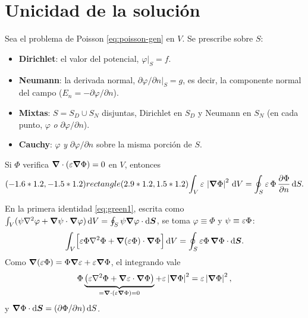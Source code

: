 \documentclass[11pt,a4paper,twoside]{article}
\begin{document}
\section{Unicidad de la solución}

\begin{definicion}\label{def:cc}
Sea el problema de Poisson \eqref{eq:poisson-gen} en $V$. Se prescribe sobre $S$:
\begin{itemize}
  \item \textbf{Dirichlet}: el valor del potencial, $\varphi\big|_S=f$.
  \item \textbf{Neumann}: la derivada normal, $\partial\varphi/\partial n\big|_S=g$, es decir,
  la componente normal del campo ($E_n=-\partial\varphi/\partial n$).
  \item \textbf{Mixtas}: $S=S_D\cup S_N$ disjuntas, Dirichlet en $S_D$ y Neumann en $S_N$
  (en cada punto, $\varphi$ \emph{o} $\partial\varphi/\partial n$).
  \item \textbf{Cauchy}: $\varphi$ \emph{y} $\partial\varphi/\partial n$ sobre la misma
  porción de $S$.
\end{itemize}
\end{definicion}

\begin{lema}\label{lem:energia}
Si $\Phi$ verifica $\bm{\nabla}\cdot(\varepsilon\bm{\nabla}\Phi)=0$ en $V$, entonces
\begin{equation}\label{eq:energia}
  (-1.6*1.2,-1.5*1.2) rectangle (2.9*1.2,1.5*1.2){\int_{V}\varepsilon\,\left\lvert \bm{\nabla}\Phi\right\rvert^{2}\,\mathrm{d} V=\oint_{S}\varepsilon\,\Phi\,\frac{\partial \Phi}{\partial n}\,\mathrm{d} S .}
\end{equation}
\end{lema}

\begin{demostracion}
En la primera identidad \eqref{eq:green1}, escrita como
$\int_V(\psi\nabla^{2}\varphi+\bm{\nabla}\psi\cdot\bm{\nabla}\varphi)\,\mathrm{d} V=\oint_S\psi\bm{\nabla}\varphi\cdot\mathrm{d}\bm{S}$, se
toma $\varphi\equiv\Phi$ y $\psi\equiv\varepsilon\Phi$:
\[
  \int_V\Bigl[\varepsilon\Phi\nabla^{2}\Phi+\bm{\nabla}(\varepsilon\Phi)\cdot\bm{\nabla}\Phi\Bigr]\,\mathrm{d} V
  =\oint_S\varepsilon\Phi\,\bm{\nabla}\Phi\cdot\mathrm{d}\bm{S} .
\]
Como $\bm{\nabla}(\varepsilon\Phi)=\Phi\bm{\nabla}\varepsilon+\varepsilon\bm{\nabla}\Phi$, el integrando vale
\[
  \Phi\underbrace{\bigl(\varepsilon\nabla^{2}\Phi+\bm{\nabla}\varepsilon\cdot\bm{\nabla}\Phi\bigr)}_{=\bm{\nabla}\cdot(\varepsilon\bm{\nabla}\Phi)=0}
  +\varepsilon\left\lvert \bm{\nabla}\Phi\right\rvert^{2}=\varepsilon\left\lvert \bm{\nabla}\Phi\right\rvert^{2},
\]
y $\bm{\nabla}\Phi\cdot\mathrm{d}\bm{S}=(\partial\Phi/\partial n)\,\mathrm{d} S$.
\end{demostracion}
\end{document}
